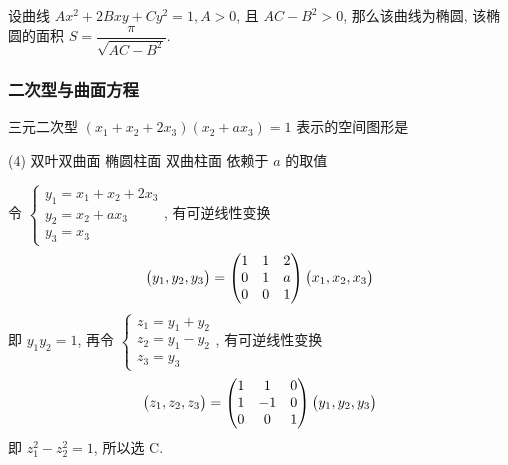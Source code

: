 \begin{inference}[一般椭圆面积公式]
    设曲线 $Ax^2+2Bxy+Cy^2=1,A>0$, 且 $AC-B^2>0$, 那么该曲线为椭圆, 该椭圆的面积 $S=\dfrac{\pi}{\sqrt{AC-B^2}}.$
\end{inference}

\subsubsection{二次型与曲面方程}

\begin{example}
    三元二次型 $(x_1+x_2+2x_3)(x_2+ax_3)=1$ 表示的空间图形是
    \begin{tasks}(4)
        \task 双叶双曲面
        \task 椭圆柱面
        \task 双曲柱面
        \task 依赖于 $a$ 的取值
    \end{tasks}
\end{example}
\begin{solution}
    令 $\begin{cases}
            y_1=x_1+x_2+2x_3 \\
            y_2=x_2+ax_3     \\
            y_3=x_3
        \end{cases}$, 有可逆线性变换 $$
        \mqty(y_1,y_2,y_3)=\begin{pmatrix} 1 & 1 & 2 \\ 0 & 1 & a \\ 0 & 0 & 1 \\\end{pmatrix}\mqty(x_1,x_2,x_3)
    $$
    即 $y_1y_2=1$, 再令 $\begin{cases}
            z_1=y_1+y_2 \\
            z_2=y_1-y_2 \\
            z_3=y_3
        \end{cases}$, 有可逆线性变换
    $$
        \mqty(z_1,z_2,z_3)=\begin{pmatrix} 1 & 1 & 0 \\ 1 & -1 & 0 \\ 0 & 0 & 1 \\\end{pmatrix}\mqty(y_1, y_2, y_3)
    $$
    即 $z_1^2-z_2^2=1$, 所以选 C.
\end{solution}


